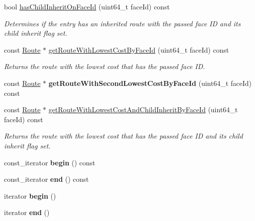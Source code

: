\begin{DoxyCompactItemize}
\item 
bool \hyperlink{classnfd_1_1rib_1_1RibEntry_aeea7da974220e97208f42540fd634c14}{has\+Child\+Inherit\+On\+Face\+Id} (uint64\+\_\+t face\+Id) const
\begin{DoxyCompactList}\small\item\em Determines if the entry has an inherited route with the passed face ID and its child inherit flag set. \end{DoxyCompactList}\item 
const \hyperlink{classnfd_1_1rib_1_1Route}{Route} $\ast$ \hyperlink{classnfd_1_1rib_1_1RibEntry_a14f040972c02c352c7c0987cbb1964e8}{get\+Route\+With\+Lowest\+Cost\+By\+Face\+Id} (uint64\+\_\+t face\+Id) const
\begin{DoxyCompactList}\small\item\em Returns the route with the lowest cost that has the passed face ID. \end{DoxyCompactList}\item 
const \hyperlink{classnfd_1_1rib_1_1Route}{Route} $\ast$ {\bfseries get\+Route\+With\+Second\+Lowest\+Cost\+By\+Face\+Id} (uint64\+\_\+t face\+Id) const\hypertarget{classnfd_1_1rib_1_1RibEntry_ac9522ec75114245df81b85c954319ae8}{}\label{classnfd_1_1rib_1_1RibEntry_ac9522ec75114245df81b85c954319ae8}

\item 
const \hyperlink{classnfd_1_1rib_1_1Route}{Route} $\ast$ \hyperlink{classnfd_1_1rib_1_1RibEntry_a89872006c24dcb470b5e1c7a189168ea}{get\+Route\+With\+Lowest\+Cost\+And\+Child\+Inherit\+By\+Face\+Id} (uint64\+\_\+t face\+Id) const
\begin{DoxyCompactList}\small\item\em Returns the route with the lowest cost that has the passed face ID and its child inherit flag set. \end{DoxyCompactList}\item 
const\+\_\+iterator {\bfseries begin} () const\hypertarget{classnfd_1_1rib_1_1RibEntry_a6e47b26490942ad57cb88f26170ef74b}{}\label{classnfd_1_1rib_1_1RibEntry_a6e47b26490942ad57cb88f26170ef74b}

\item 
const\+\_\+iterator {\bfseries end} () const\hypertarget{classnfd_1_1rib_1_1RibEntry_a2dd0cf394feec1fbe647bcd5e76d048f}{}\label{classnfd_1_1rib_1_1RibEntry_a2dd0cf394feec1fbe647bcd5e76d048f}

\item 
iterator {\bfseries begin} ()\hypertarget{classnfd_1_1rib_1_1RibEntry_adb1e4d2cebe31e7b477ccea61dcef192}{}\label{classnfd_1_1rib_1_1RibEntry_adb1e4d2cebe31e7b477ccea61dcef192}

\item 
iterator {\bfseries end} ()\hypertarget{classnfd_1_1rib_1_1RibEntry_a4dcf0fa10ab014d58e1330ea15e837cc}{}\label{classnfd_1_1rib_1_1RibEntry_a4dcf0fa10ab014d58e1330ea15e837cc}

\end{DoxyCompactItemize}


